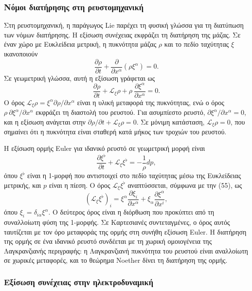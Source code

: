 \documentclass[12pt]{article}
\begin{document}
\subsubsection{Νόμοι διατήρησης στη ρευστομηχανική}

Στη ρευστομηχανική, η παράγωγος Lie παρέχει τη φυσική γλώσσα για τη διατύπωση των νόμων διατήρησης. Η εξίσωση συνέχειας εκφράζει τη διατήρηση της μάζας. Σε έναν χώρο με Ευκλείδεια μετρική, η πυκνότητα μάζας $\rho$ και το πεδίο ταχύτητας $\xi$ ικανοποιούν
\[
\frac{\partial \rho}{\partial t} + \frac{\partial}{\partial x^\alpha} (\rho \xi^\alpha) = 0.
\]
Σε γεωμετρική γλώσσα, αυτή η εξίσωση γράφεται ως
\[
\frac{\partial \rho}{\partial t} + \mathcal{L}_\xi \rho + \rho \ \frac{\partial \xi^\alpha}{\partial x^\alpha} = 0.
\]
Ο όρος $\mathcal{L}_\xi \rho = \xi^\alpha \partial \rho / \partial x^\alpha$ είναι η υλική μεταφορά της πυκνότητας, ενώ ο όρος $\rho \ \partial \xi^\alpha / \partial x^\alpha$ εκφράζει τη διαστολή του ρευστού. Για ασυμπίεστο ρευστό, $\partial \xi^\alpha / \partial x^\alpha = 0$, και η εξίσωση ανάγεται στην $\partial \rho / \partial t + \mathcal{L}_\xi \rho = 0$. Σε μόνιμη κατάσταση, $\mathcal{L}_\xi \rho = 0$, που σημαίνει ότι η πυκνότητα είναι σταθερή κατά μήκος των τροχιών του ρευστού.

Η εξίσωση ορμής Euler για ιδανικό ρευστό σε γεωμετρική μορφή είναι
\[
\frac{\partial \xi^\flat}{\partial t} + \mathcal{L}_\xi \xi^\flat = -\frac{1}{\rho} dp,
\]
όπου $\xi^\flat$ είναι η 1-μορφή που αντιστοιχεί στο πεδίο ταχύτητας μέσω της Ευκλείδειας μετρικής, και $p$ είναι η πίεση. Ο όρος $\mathcal{L}_\xi \xi^\flat$ αναπτύσσεται, σύμφωνα με την (55), ως
\[
(\mathcal{L}_\xi \xi^\flat)_i = \xi^\alpha \frac{\partial \xi_i}{\partial x^\alpha} + \xi_\alpha \frac{\partial \xi^\alpha}{\partial x^i},
\]
όπου $\xi_i = \delta_{i\alpha} \xi^\alpha$. Ο δεύτερος όρος είναι η διόρθωση που προκύπτει από τη συναλλοίωτη φύση της 1-μορφής. Σε Καρτεσιανές συντεταγμένες, ο όρος αυτός ταυτίζεται με τον όρο μεταφοράς της ορμής στη συνήθη εξίσωση Euler. Η διατήρηση της ορμής σε ένα ιδανικό ρευστό συνδέεται με τη χωρική ομοιογένεια της Λαγκρανζιανής περιγραφής: η Λαγκρανζιανή πυκνότητα του ρευστού είναι αναλλοίωτη σε χωρικές μεταφορές, και το θεώρημα Noether δίνει τη διατήρηση της ορμής.

\subsubsection{Εξίσωση συνέχειας στην ηλεκτροδυναμική}
\end{document}
